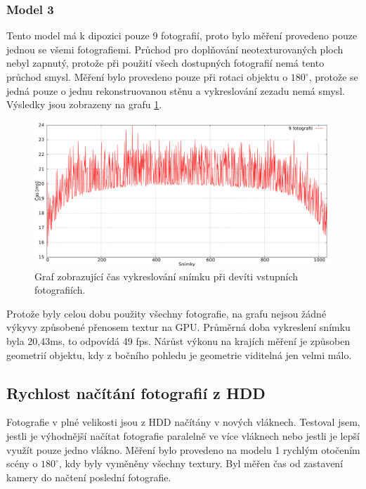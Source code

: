 \documentclass[11pt,twoside,a4paper]{book}
\begin{document}
\subsubsection*{Model 3}

Tento model má k dipozici pouze 9 fotografií, proto bylo měření provedeno pouze jednou se všemi fotografiemi. Průchod pro doplňování neotexturovaných ploch nebyl zapnutý, protože při použití všech dostupných fotografií nemá tento průchod smysl. Měření bylo provedeno pouze při rotaci objektu o $180^{\circ}$, protože se jedná pouze o jednu rekonstruovanou stěnu a vykreslování zezadu nemá smysl. Výsledky jsou zobrazeny na grafu \ref{fig:data-6}.

\begin{figure}[h]
\begin{center}
\includegraphics[width=\textwidth]{figures/data-6}
\caption{Graf zobrazující čas vykreslování snímku při devíti vstupních fotografiích.}
\label{fig:data-6}
\end{center}
\end{figure}

Protože byly celou dobu použity všechny fotografie, na grafu nejsou žádné výkyvy způsobené přenosem textur na GPU. Průměrná doba vykreslení snímku byla 20,43ms, to odpovídá 49 fps. Nárůst výkonu na krajích měření je způsoben geometrií objektu, kdy z bočního pohledu je geometrie viditelná jen velmi málo.

\subsection{Rychlost načítání fotografií z HDD}
\label{sec:hdd}

Fotografie v plné velikosti jsou z HDD načítány v nových vláknech. Testoval jsem, jestli je výhodnější načítat fotografie paralelně ve více vláknech nebo jestli je lepší využít pouze jedno vlákno. Měření bylo provedeno na modelu 1 rychlým otočením scény o $180^{\circ}$, kdy byly vyměněny všechny textury. Byl měřen čas od zastavení kamery do načtení poslední fotografie.
\end{document}
